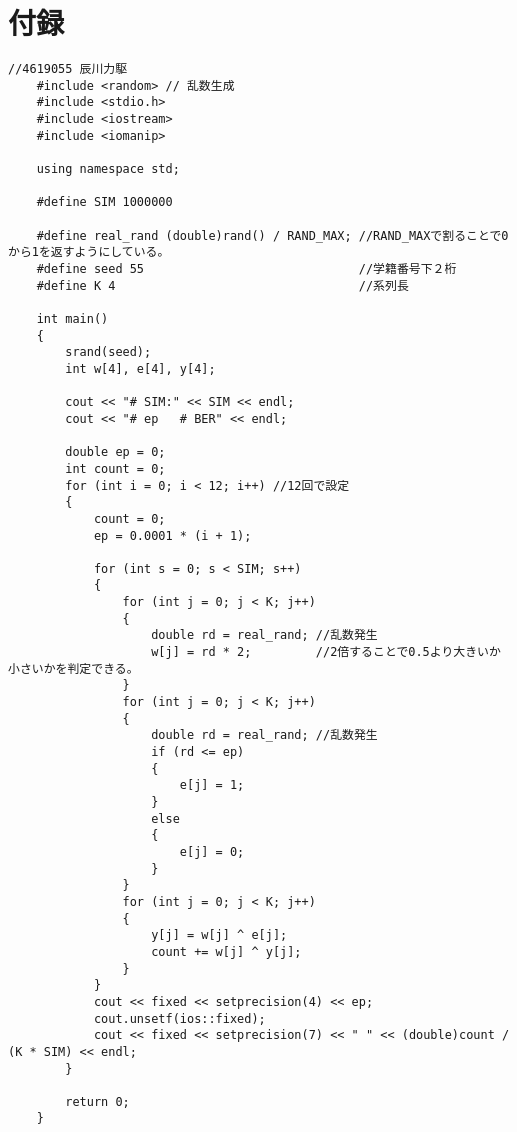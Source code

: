 \documentclass[12pt]{jarticle}
\begin{document}
\section{付録}
\begin{lstlisting}[style = lstcpp,caption=kadai3\_rand.cpp]
    //4619055 辰川力駆
    #include <random> // 乱数生成
    #include <stdio.h>
    #include <iostream>
    #include <iomanip>
    
    using namespace std;
    
    #define SIM 1000000
    
    #define real_rand (double)rand() / RAND_MAX; //RAND_MAXで割ることで0から1を返すようにしている。
    #define seed 55                              //学籍番号下２桁
    #define K 4                                  //系列長
    
    int main()
    {
        srand(seed);
        int w[4], e[4], y[4];
    
        cout << "# SIM:" << SIM << endl;
        cout << "# ep   # BER" << endl;
    
        double ep = 0;
        int count = 0;
        for (int i = 0; i < 12; i++) //12回で設定
        {
            count = 0;
            ep = 0.0001 * (i + 1);
    
            for (int s = 0; s < SIM; s++)
            {
                for (int j = 0; j < K; j++)
                {
                    double rd = real_rand; //乱数発生
                    w[j] = rd * 2;         //2倍することで0.5より大きいか小さいかを判定できる。
                }
                for (int j = 0; j < K; j++)
                {
                    double rd = real_rand; //乱数発生
                    if (rd <= ep)
                    {
                        e[j] = 1;
                    }
                    else
                    {
                        e[j] = 0;
                    }
                }
                for (int j = 0; j < K; j++)
                {
                    y[j] = w[j] ^ e[j];
                    count += w[j] ^ y[j];
                }
            }
            cout << fixed << setprecision(4) << ep;
            cout.unsetf(ios::fixed);
            cout << fixed << setprecision(7) << " " << (double)count / (K * SIM) << endl;
        }
    
        return 0;
    }
\end{lstlisting}

\end{document}

